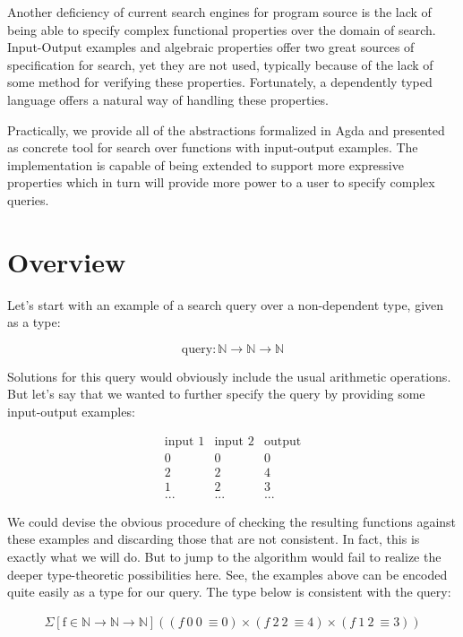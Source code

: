 \documentclass[acmsmall,review,authorversion]{acmart}
\begin{document}
Another deficiency of current search engines for program source is the lack of
being able to specify complex functional properties over the domain of search.
Input-Output examples and algebraic properties offer two great sources of
specification for search, yet they are not used, typically because of the lack
of some method for verifying these properties. Fortunately, a dependently
typed language offers a natural way of handling these properties.

Practically, we provide all of the abstractions formalized in Agda and presented
as concrete tool for search over functions with input-output examples. The
implementation is capable of being extended to support more expressive
properties which in turn will provide more power to a user to specify complex
queries.

\section{Overview}

Let's start with an example of a search query over a non-dependent type, given
as a type:

$$
\text{query} : \mathbb{N} \rightarrow \mathbb{N} \rightarrow \mathbb{N}
$$

Solutions for this query would obviously include the usual arithmetic
operations. But let's say that we wanted to further specify the query by
providing some input-output examples:

$$
\begin{array}{ccc}
  \text{input 1} & \text{input 2} & \text{output}\\
  0 & 0 & 0\\
  2 & 2 & 4\\
  1 & 2 & 3\\
  ... &...&...
\end{array}
$$

We could devise the obvious procedure of checking the resulting functions
against these examples and discarding those that are not consistent. In fact,
this is exactly what we will do. But to jump to the algorithm would fail to
realize the deeper type-theoretic possibilities here. See, the examples above
can be encoded quite easily as a type for our query. The type below is
consistent with the query:

$$
\begin{array}{c}
\Sigma[\text{f} \in \mathbb{N} \rightarrow \mathbb{N} \rightarrow
  \mathbb{N}] ((f\ 0\ 0\ \equiv 0) \times (f\ 2\ 2\ \equiv 4) \times (f\ 1\ 2\
  \equiv 3))
\end{array}
$$
\end{document}
